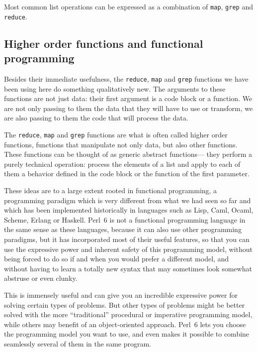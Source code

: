 Most common list operations can be expressed as a combination
of {\tt map}, {\tt grep} and {\tt reduce}.

\subsection{Higher order functions and functional programming}
\label{array_functional_programming}

Besides their immediate usefulness, the {\tt reduce}, {\tt map} 
and {\tt grep} functions we have been using here do something 
qualitatively new. The arguments to these functions are not 
just data: their first argument is a code block or a function. 
We are not only passing to them the data that they will have 
to use or transform, we are also passing to them the code 
that will process the data.


The {\tt reduce}, {\tt map} and {\tt grep} functions are 
what is often called higher order functions, functions that 
manipulate not only data, but also other functions. These 
functions can be thought of as generic abstract functions--- 
they perform a purely technical operation: process the  
elements of a list and apply to each of them a behavior 
defined in the code block or the function of the first 
parameter.

These ideas are to a large extent rooted in functional 
programming, a programming paradigm which is very different 
from what we had seen so far and which has been implemented 
historically in languages such as Lisp, Caml, Ocaml, Scheme, 
Erlang or Haskell. Perl~6 is not a functional 
programming language in the same sense as these languages, 
because it can also use other programming paradigms, 
but it has incorporated most of their useful features, so 
that you can use the expressive power and inherent safety 
of this programming model, without being forced to do so 
if and when you would prefer a different model, and
without having to learn a totally new syntax that may 
sometimes look somewhat abstruse or even clunky.

This is immensely useful and can give you an incredible 
expressive power for solving certain types of problems. But 
other types of problems might be better solved with the more ``traditional'' procedural or imperative programming model, 
while others may benefit of an object-oriented approach. Perl~6 
lets you choose the programming model you want to use, and even 
makes it possible to combine seamlessly several of them in the 
same program.

